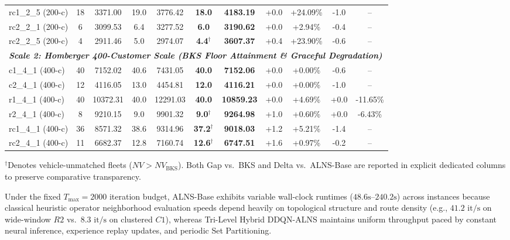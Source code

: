 \documentclass{ieeeaccess}
\begin{document}
\begin{table}[!t]
\begin{tabular*}{\textwidth}{@{\extracolsep{\fill}} l cc cc cc cc cc @{}}
rc1\_2\_5 (200-c) & 18 & 3371.00 & 19.0 & 3776.42 & \textbf{18.0} & \textbf{4183.19} & +0.0 & +24.09\% & -1.0 & -- \\
rc2\_2\_1 (200-c) & 6 & 3099.53 & 6.4 & 3277.52 & \textbf{6.0} & \textbf{3190.62} & +0.0 & +2.94\% & -0.4 & -- \\
rc2\_2\_5 (200-c) & 4 & 2911.46 & 5.0 & 2974.07 & \textbf{4.4}$^\dagger$ & \textbf{3607.37} & +0.4 & +23.90\% & -0.6 & -- \\
\midrule
\multicolumn{11}{l}{\textit{\textbf{Scale 2: Homberger 400-Customer Scale (BKS Floor Attainment \& Graceful Degradation)}}} \\
c1\_4\_1 (400-c) & 40 & 7152.02 & 40.6 & 7431.05 & \textbf{40.0} & \textbf{7152.06} & +0.0 & +0.00\% & -0.6 & -- \\
c2\_4\_1 (400-c) & 12 & 4116.05 & 13.0 & 4454.81 & \textbf{12.0} & \textbf{4116.21} & +0.0 & +0.00\% & -1.0 & -- \\
r1\_4\_1 (400-c) & 40 & 10372.31 & 40.0 & 12291.03 & \textbf{40.0} & \textbf{10859.23} & +0.0 & +4.69\% & +0.0 & -11.65\% \\
r2\_4\_1 (400-c) & 8 & 9210.15 & 9.0 & 9901.32 & \textbf{9.0}$^\dagger$ & \textbf{9264.98} & +1.0 & +0.60\% & +0.0 & -6.43\% \\
rc1\_4\_1 (400-c) & 36 & 8571.32 & 38.6 & 9314.96 & \textbf{37.2}$^\dagger$ & \textbf{9018.03} & +1.2 & +5.21\% & -1.4 & -- \\
rc2\_4\_1 (400-c) & 11 & 6682.37 & 12.8 & 7160.74 & \textbf{12.6}$^\dagger$ & \textbf{6747.51} & +1.6 & +0.97\% & -0.2 & -- \\
\bottomrule
\end{tabular*}
{\raggedright \footnotesize 

\vspace{1mm}
$^\dagger$Denotes vehicle-unmatched fleets ($NV > NV_{\text{BKS}}$). Both Gap vs.\ BKS and Delta vs.\ ALNS-Base are reported in explicit dedicated columns to preserve comparative transparency.\par}
\end{table}

Under the fixed $T_{\max}=2000$ iteration budget, ALNS-Base exhibits variable wall-clock runtimes ($48.6\text{s}$--$240.2\text{s}$) across instances because classical heuristic operator neighborhood evaluation speeds depend heavily on topological structure and route density (e.g., $41.2\text{ it/s}$ on wide-window $R2$ vs.\ $8.3\text{ it/s}$ on clustered $C1$), whereas Tri-Level Hybrid DDQN-ALNS maintains uniform throughput paced by constant neural inference, experience replay updates, and periodic Set Partitioning.
\end{document}
